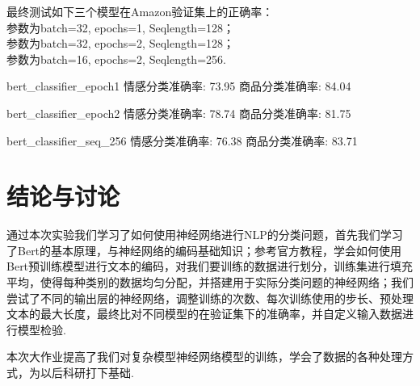 \documentclass[12pt, a4paper, oneside]{ctexart}
\numberwithin{equation}{section}  %
\begin{document}
最终测试如下三个模型在Amazon验证集上的正确率：\\参数为batch=32, epochs=1, Seqlength=128；\\
参数为batch=32, epochs=2, Seqlength=128；\\
参数为batch=16, epochs=2, Seqlength=256.
\begin{pythoncode}
bert_classifier_epoch1
情感分类准确率: 73.95%
商品分类准确率: 84.04%

bert_classifier_epoch2
情感分类准确率: 78.74%
商品分类准确率: 81.75%

bert_classifier_seq_256
情感分类准确率: 76.38%
商品分类准确率: 83.71%
\end{pythoncode}
\section{结论与讨论}
通过本次实验我们学习了如何使用神经网络进行NLP的分类问题，首先我们学习了Bert的基本原理，与神经网络的编码基础知识；参考官方教程，学会如何使用Bert预训练模型进行文本的编码，对我们要训练的数据进行划分，训练集进行填充平均，使得每种类别的数据均匀分配，并搭建用于实际分类问题的神经网络；我们尝试了不同的输出层的神经网络，调整训练的次数、每次训练使用的步长、预处理文本的最大长度，最终比对不同模型的在验证集下的准确率，并自定义输入数据进行模型检验.

本次大作业提高了我们对复杂模型神经网络模型的训练，学会了数据的各种处理方式，为以后科研打下基础.

\end{document}
